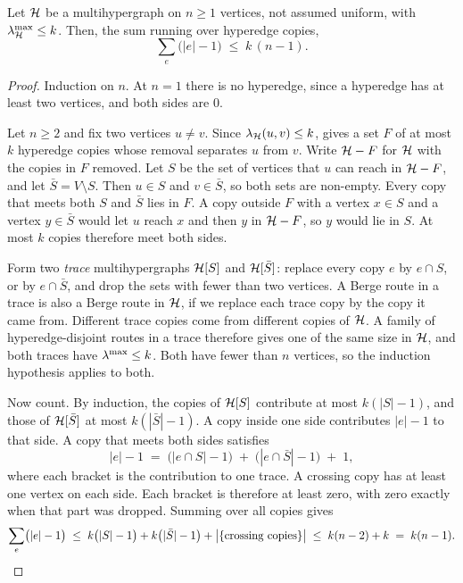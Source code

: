 \begin{lemma}\label{lem:hyper-cut-induction}
Let $\mathcal{H}$ be a multihypergraph on $n \ge 1$ vertices, not assumed uniform, with
$\lambda^{\max}_{\mathcal{H}} \le k$. Then, the sum running over hyperedge copies,
\[
    \sum_{e} \bigl(|e| - 1\bigr) \;\le\; k\,(n-1).
\]
\end{lemma}

\begin{proof}
Induction on $n$. At $n = 1$ there is no hyperedge, since a hyperedge has at least two vertices, and both sides are $0$.

Let $n \ge 2$ and fix two vertices $u \ne v$.
Since $\lambda_{\mathcal{H}}(u,v) \le k$,  gives a set $F$ of at most $k$ hyperedge copies whose removal separates $u$ from $v$.
Write $\mathcal{H} - F$ for $\mathcal{H}$ with the copies in $F$ removed.
Let $S$ be the set of vertices that $u$ can reach in $\mathcal{H} - F$, and let $\bar S = V \setminus S$.
Then $u \in S$ and $v \in \bar S$, so both sets are non-empty.
Every copy that meets both $S$ and $\bar S$ lies in $F$. A copy outside $F$ with a vertex $x \in S$ and a vertex $y \in \bar S$ would let $u$ reach $x$ and then $y$ in $\mathcal{H} - F$, so $y$ would lie in $S$.
At most $k$ copies therefore meet both sides.

Form two \emph{trace} multihypergraphs $\mathcal{H}[S]$ and $\mathcal{H}[\bar S]$: replace every copy $e$ by $e \cap S$, or by $e \cap \bar S$, and drop the sets with fewer than two vertices.
A Berge route in a trace is also a Berge route in $\mathcal{H}$, if we replace each trace copy by the copy it came from.
Different trace copies come from different copies of $\mathcal{H}$.
A family of hyperedge-disjoint routes in a trace therefore gives one of the same size in $\mathcal{H}$, and both traces have $\lambda^{\max} \le k$. Both have fewer than $n$ vertices, so the induction hypothesis applies to both.

Now count. By induction, the copies of $\mathcal{H}[S]$ contribute at most $k(|S|-1)$, and those of $\mathcal{H}[\bar S]$ at most $k(|\bar S|-1)$.
A copy inside one side contributes $|e| - 1$ to that side.
A copy that meets both sides satisfies
\[
    |e| - 1 \;=\; \bigl(|e \cap S| - 1\bigr)
              \;+\; \bigl(|e \cap \bar S| - 1\bigr) \;+\; 1,
\]
where each bracket is the contribution to one trace. A crossing copy has at least one vertex on each side. Each bracket is therefore at least zero, with zero exactly when that part was dropped.
Summing over all copies gives
\[
    \sum_e \bigl(|e|-1\bigr)
    \;\le\; k\bigl(|S| - 1\bigr) + k\bigl(|\bar S| - 1\bigr)
            + \bigl|\{\text{crossing copies}\}\bigr|
    \;\le\; k(n-2) + k \;=\; k(n-1). \qedhere
\]
\end{proof}

